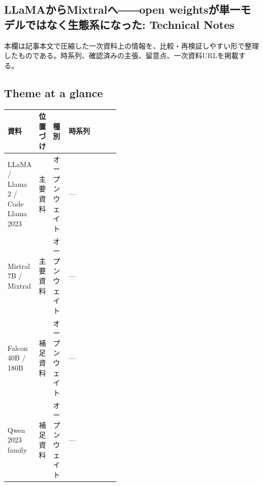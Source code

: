 \subsection*{LLaMAからMixtralへ――open weightsが単一モデルではなく生態系になった: Technical Notes}
本欄は記事本文で圧縮した一次資料上の情報を、比較・再検証しやすい形で整理したものである。時系列、確認済みの主張、留意点、一次資料URLを掲載する。
\medskip
\subsection*{Theme at a glance}
\begin{center}
\footnotesize
\begin{tabularx}{\linewidth}{@{}p{0.20\linewidth}p{0.10\linewidth}p{0.14\linewidth}X@{}}
\toprule
資料 & 位置づけ & 種別 & 時系列 \\
\midrule
LLaMA / Llama 2 / Code Llama 2023 & 主要資料 & オープンウェイト & — \\
Mistral 7B / Mixtral & 主要資料 & オープンウェイト & — \\
Falcon 40B / 180B & 補足資料 & オープンウェイト & — \\
Qwen 2023 family & 補足資料 & オープンウェイト & — \\
\bottomrule
\end{tabularx}
\end{center}
\normalsize

